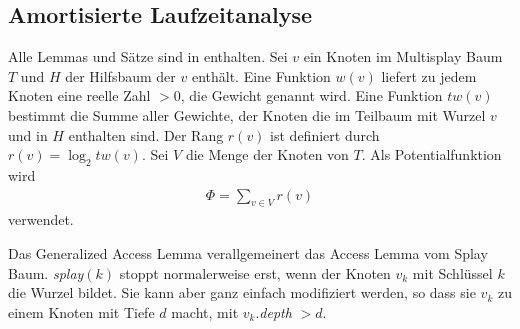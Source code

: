 \documentclass[a4paper,12pt]{article}
\begin{document}
\subsection{Amortisierte Laufzeitanalyse}
Alle Lemmas und Sätze sind in \cite{multisplay} enthalten.
Sei $v$ ein Knoten im Multisplay Baum $T$ und $H$ der Hilfsbaum der $v$ enthält. Eine Funktion $w\left(v\right)$ liefert zu jedem Knoten eine reelle Zahl $>0$, die Gewicht genannt wird. Eine Funktion $\mathit{tw}\left(v\right)$ bestimmt die Summe aller Gewichte, der Knoten die im Teilbaum mit Wurzel $v$ und in $H$ enthalten sind. Der Rang  $r\left(v\right)$ ist definiert durch $r\left(v\right) = \log_2  \mathit{tw}\left(v\right)$. Sei $V$ die Menge der Knoten von $T$. Als Potentialfunktion wird 
\begin{align*}
\Phi = \sum_{v \in V} r\left(v\right)
\end{align*}
verwendet.

\noindent Das Generalized Access Lemma verallgemeinert das Access Lemma vom Splay Baum. \textit{splay}$\left(k\right)$ stoppt normalerweise erst, wenn der Knoten $v_k$ mit Schlüssel $k$ die Wurzel bildet. Sie kann aber ganz einfach modifiziert werden, so dass sie $v_k$ zu einem Knoten mit Tiefe $d$ macht, mit $v_k.$\textit{depth} $> d $.
\end{document}
